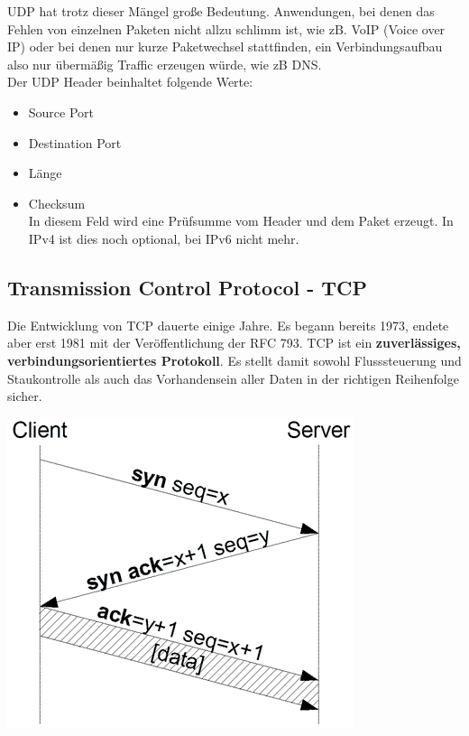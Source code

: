 \documentclass[12pt,a4paper]{report}
\begin{document}
UDP hat trotz dieser Mängel große Bedeutung. Anwendungen, bei denen das Fehlen von einzelnen Paketen nicht allzu schlimm ist, wie zB. VoIP (Voice over IP) oder bei denen nur kurze Paketwechsel stattfinden, ein Verbindungsaufbau also nur übermäßig Traffic erzeugen würde, wie zB DNS.\\

Der UDP Header beinhaltet folgende Werte: 
\begin{itemize}
\item Source Port
\item Destination Port
\item Länge
\item Checksum\\
In diesem Feld wird eine Prüfsumme vom Header und dem Paket erzeugt. In IPv4 ist dies noch optional, bei IPv6 nicht mehr.
\end{itemize}
\subsection{Transmission Control Protocol - TCP}
Die Entwicklung von TCP dauerte einige Jahre. Es begann bereits 1973, endete aber erst 1981 mit der Veröffentlichung der RFC 793. TCP ist ein \textbf{zuverlässiges, verbindungsorientiertes Protokoll}. Es stellt damit sowohl Flusssteuerung und Staukontrolle als auch das Vorhandensein aller Daten in der richtigen Reihenfolge sicher.\\

\begin{center}
\includegraphics[scale=0.6]{../docs/tarkes/pics/TcpHandshake.png}
\end{center}
\end{document}
